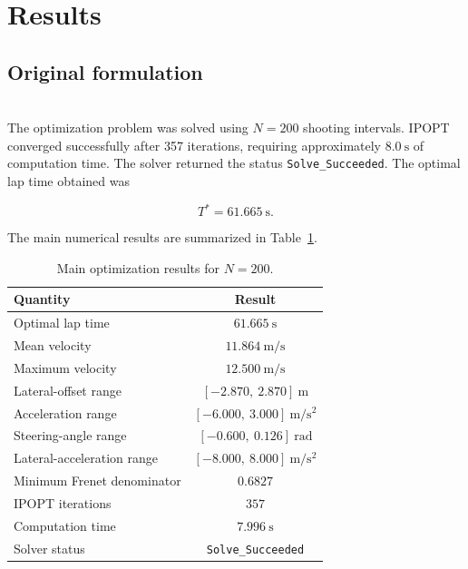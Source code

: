 \section{Results}

\subsection{Original formulation}\;\\
The optimization problem was solved using \(N=200\) shooting intervals. IPOPT converged successfully after 357 iterations, requiring approximately \(8.0~\mathrm{s}\) of computation time. The solver returned the status \texttt{Solve\_Succeeded}. The optimal lap time obtained was

\begin{equation}
    T^*=61.665~\mathrm{s}.
\end{equation}

The main numerical results are summarized in Table~\ref{tab:optimization_results}.

\begin{table}[htbp]
    \centering
    \caption{Main optimization results for \(N=200\).}
    \label{tab:optimization_results}
    \begin{tabular}{lc}
        \hline
        Quantity & Result \\
        \hline
        Optimal lap time & \(61.665~\mathrm{s}\) \\
        Mean velocity & \(11.864~\mathrm{m/s}\) \\
        Maximum velocity & \(12.500~\mathrm{m/s}\) \\
        Lateral-offset range & \([-2.870,\ 2.870]~\mathrm{m}\) \\
        Acceleration range & \([-6.000,\ 3.000]~\mathrm{m/s^2}\) \\
        Steering-angle range & \([-0.600,\ 0.126]~\mathrm{rad}\) \\
        Lateral-acceleration range & \([-8.000,\ 8.000]~\mathrm{m/s^2}\) \\
        Minimum Frenet denominator & \(0.6827\) \\
        IPOPT iterations & \(357\) \\
        Computation time & \(7.996~\mathrm{s}\) \\
        Solver status & \texttt{Solve\_Succeeded} \\
        \hline
    \end{tabular}
\end{table}

